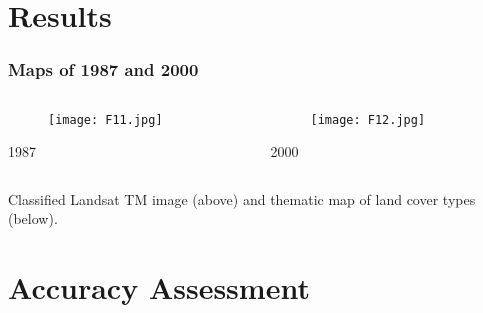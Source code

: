 \documentclass[pdflatex,compress,8pt,
	xcolor={dvipsnames,dvipsnames,svgnames,x11names,table},
	hyperref={colorlinks = true,
	breaklinks = true, 
	urlcolor = NavyBlue, 
	breaklinks = true}]{beamer}
\begin{document}
\section{Results}
\begin{frame}\frametitle{Maps of 1987 and 2000}
\begin{minipage}[0.4\textheight]{\textwidth}
\begin{columns}[T]
\begin{column}{0.5\textwidth}
\begin{figure}[H]
	\centering
		\texttt{[image: F11.jpg]}
\end{figure}
\small{1987}
\end{column}
\begin{column}{0.5\textwidth}
\begin{figure}[H]
	\centering
		\texttt{[image: F12.jpg]}
\end{figure}
\small{2000}
\end{column}
\end{columns}
\end{minipage}
Classified Landsat TM image (above) and thematic map of land cover types (below).
\end{frame}

\section{Accuracy Assessment}
\end{document}
